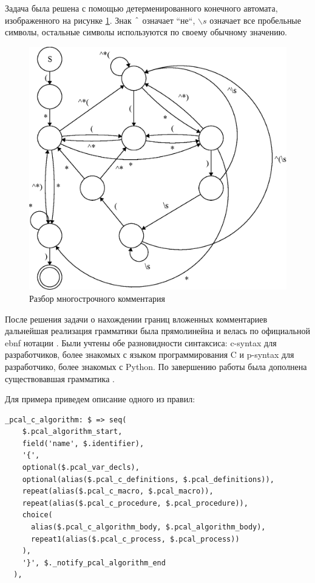\documentclass[14pt, openany]{report}
\begin{document}
Задача была решена с помощью детерменированного конечного автомата, изображенного на рисунке \ref{fig:blockComment}. Знак \(\char`^\) означает ``не``, \(\backslash s\) означает все пробельные символы, остальные символы используются по своему обычному значению.

\newpage

\begin{figure}[h]
  \includegraphics[scale=0.9]{blockComment}
  \caption{Разбор многострочного комментария}
  \label{fig:blockComment}
\end{figure}

После решения задачи о нахождении границ вложенных комментариев дальнейшая реализация грамматики была прямолинейна и велась по официальной ebnf нотации \cite{pcalEbnf}. Были учтены обе разновидности синтаксиса: c-syntax для разработчиков, более знакомых с языком программирования C и p-syntax для разработчико, более знакомых с Python. По завершению работы была дополнена существовавшая грамматика \cite{pcalGrammar}.

Для примера приведем описание одного из правил:

\begin{lstlisting}[label=listing:pcalCSyntax, caption=Правило tree-sitter грамматики для PlusCal C-syntax алгоритма, captionpos=b, style=progStyle]
  _pcal_c_algorithm: $ => seq(
    $.pcal_algorithm_start,
    field('name', $.identifier),
    '{',
    optional($.pcal_var_decls),
    optional(alias($.pcal_c_definitions, $.pcal_definitions)),
    repeat(alias($.pcal_c_macro, $.pcal_macro)),
    repeat(alias($.pcal_c_procedure, $.pcal_procedure)),
    choice(
      alias($.pcal_c_algorithm_body, $.pcal_algorithm_body),
      repeat1(alias($.pcal_c_process, $.pcal_process))
    ),
    '}', $._notify_pcal_algorithm_end
  ),
\end{lstlisting}
\end{document}
